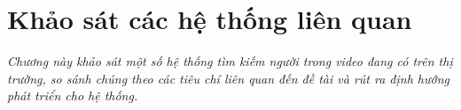 \chapter{Khảo sát các hệ thống liên quan}
\label{chapter:lienquan}

\textit{Chương này khảo sát một số hệ thống tìm kiếm người trong video đang có trên thị trường, so sánh chúng theo các tiêu chí liên quan đến đề tài và rút ra định hướng phát triển cho hệ thống.}




